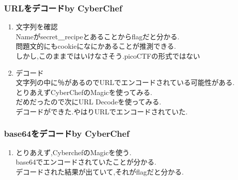 \documentclass{jsarticle}
\begin{document}
\subsubsection{URLをデコードby CyberChef}
\begin{enumerate}
	\item 文字列を確認\\
	Nameがsecret＿recipeとあることからflagだと分かる.\\
	問題文的にもcookieになにかあることが推測できる.\\
	しかし,このままではいけなさそう.picoCTF{}の形式ではない
	\item デコード\\
	文字列の中に％があるのでURLでエンコードされている可能性がある.\\
	とりあえずCyberChefのMagicを使ってみる.\\
	だめだったので次にURL Decodeを使ってみる.\\
	デコードができた.やはりURLでエンコードされていた.\\
\end{enumerate}

\subsubsection{base64をデコードby CyberChef}
\begin{enumerate}
	\item とりあえず,CyberchefのMagicを使う.\\
	base64でエンコードされていたことが分かる.\\
	デコードされた結果が出ていて,それがflagだと分かる.
\end{enumerate}
\end{document}
